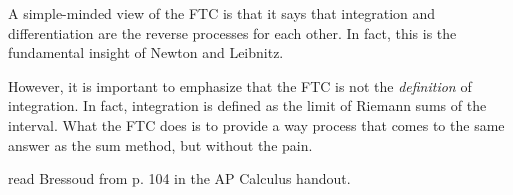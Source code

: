 \documentclass[11pt, oneside]{article}   	%
\begin{document}
A simple-minded view of the FTC is that it says that integration and differentiation are the reverse processes for each other.  In fact, this is the fundamental insight of Newton and Leibnitz.

However, it is important to emphasize that the FTC is not the \emph{definition} of integration.  In fact, integration is defined as the limit of Riemann sums of the interval.  What the FTC does is to provide a way process that comes to the same answer as the sum method, but without the pain.

read Bressoud from p. 104 in the AP Calculus handout.
\end{document}
